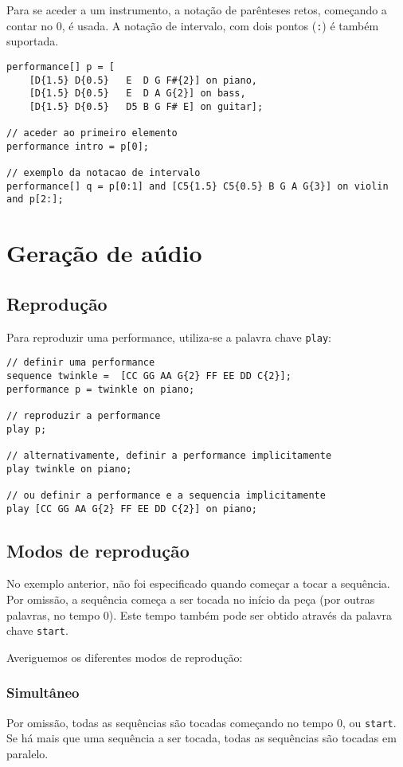 \documentclass{article}
\begin{document}
Para se aceder a um instrumento, a notação de parênteses retos, começando a contar no 0, é usada. A notação de intervalo, com dois pontos (\texttt{:}) é também suportada.
\begin{lstlisting} 
performance[] p = [
    [D{1.5} D{0.5}   E  D G F#{2}] on piano, 
    [D{1.5} D{0.5}   E  D A G{2}] on bass,
    [D{1.5} D{0.5}   D5 B G F# E] on guitar];
    
// aceder ao primeiro elemento
performance intro = p[0];

// exemplo da notacao de intervalo
performance[] q = p[0:1] and [C5{1.5} C5{0.5} B G A G{3}] on violin and p[2:];
\end{lstlisting}


\section{Geração de aúdio} \label{audio}
\subsection{Reprodução}
Para reproduzir uma performance, utiliza-se a palavra chave \texttt{play}:
\begin{lstlisting} 
// definir uma performance
sequence twinkle =  [CC GG AA G{2} FF EE DD C{2}];
performance p = twinkle on piano;

// reproduzir a performance
play p;

// alternativamente, definir a performance implicitamente
play twinkle on piano;

// ou definir a performance e a sequencia implicitamente
play [CC GG AA G{2} FF EE DD C{2}] on piano;
\end{lstlisting} 
\subsection{Modos de reprodução}
No exemplo anterior, não foi especificado quando começar a tocar a sequência. Por omissão, a sequência começa a ser tocada no início da peça (por outras palavras, no tempo 0). Este tempo também pode ser obtido através da palavra chave \texttt{start}.

Averiguemos os diferentes modos de reprodução:

\subsubsection{Simultâneo}
Por omissão, todas as sequências são tocadas começando no tempo 0, ou \texttt{start}. Se há mais que uma sequência a ser tocada, todas as sequências são tocadas em paralelo.
\end{document}
